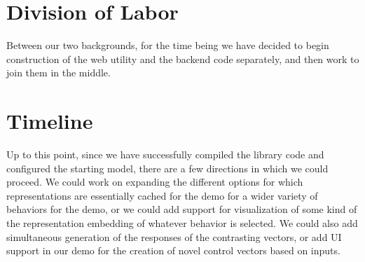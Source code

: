 \documentclass[11pt,a4paper]{article}
\begin{document}
\section{Division of Labor}
Between our two backgrounds, for the time being we have decided to begin construction of the web utility and the backend code separately, and then work to join them in the middle. 


\section{Timeline}
Up to this point, since we have successfully compiled the library code and configured the starting model, there are a few directions in which we could proceed. We could work on expanding the different options for which representations are essentially cached for the demo for a wider variety of behaviors for the demo, or we could add support for visualization of some kind of the representation embedding of whatever behavior is selected. We could also add simultaneous generation of the responses of the contrasting vectors, or add UI support in our demo for the creation of novel control vectors based on inputs.



\end{document}
